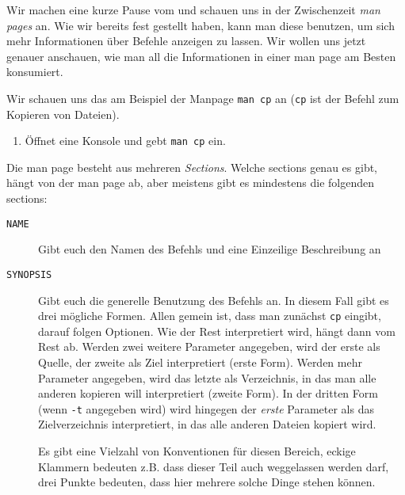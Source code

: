 
Wir machen eine kurze Pause vom \Cpp und schauen uns in der Zwischenzeit
\emph{man pages} an. Wie wir bereits fest gestellt haben, kann man diese
benutzen, um sich mehr Informationen über Befehle anzeigen zu lassen. Wir
wollen uns jetzt genauer anschauen, wie man all die Informationen in einer man
page am Besten konsumiert.

Wir schauen uns das am Beispiel der Manpage \texttt{man cp} an (\texttt{cp} ist
der Befehl zum Kopieren von Dateien).

\begin{praxis}
    \begin{enumerate}
        \item Öffnet eine Konsole und gebt \texttt{man cp} ein.
    \end{enumerate}

    Die man page besteht aus mehreren \emph{Sections}. Welche sections genau es
    gibt, hängt von der man page ab, aber meistens gibt es mindestens die folgenden
    sections:
    \begin{description}
        \item[\texttt{NAME}]
              Gibt euch den Namen des Befehls und eine Einzeilige Beschreibung an
        \item[\texttt{SYNOPSIS}]
              Gibt euch die generelle Benutzung des Befehls an. In diesem Fall gibt
              es drei mögliche Formen. Allen gemein ist, dass man zunächst
              \texttt{cp} eingibt, darauf folgen Optionen. Wie der Rest interpretiert
              wird, hängt dann vom Rest ab. Werden zwei weitere Parameter angegeben,
              wird der erste als Quelle, der zweite als Ziel interpretiert (erste
              Form). Werden mehr Parameter angegeben, wird das letzte als
              Verzeichnis, in das man alle anderen kopieren will interpretiert
              (zweite Form). In der dritten Form (wenn \texttt{-t} angegeben wird)
              wird hingegen der \emph{erste} Parameter als das Zielverzeichnis
              interpretiert, in das alle anderen Dateien kopiert wird.

              Es gibt eine Vielzahl von Konventionen für diesen Bereich, eckige
              Klammern bedeuten z.B. dass dieser Teil auch weggelassen werden darf,
              drei Punkte bedeuten, dass hier mehrere solche Dinge stehen können.


\end{description}
\end{praxis}
